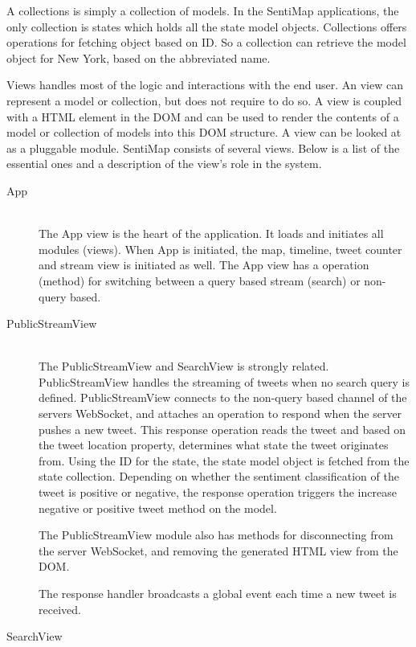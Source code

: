 A collections is simply a collection of models. In the SentiMap applications, the only collection is states which holds all the state model objects. Collections offers operations for fetching object based on ID. So a collection can retrieve the model object for New York, based on the abbreviated name. 

Views handles most of the logic and interactions with the end user. An view can represent a model or collection, but does not require to do so. A view is coupled with a HTML element in the DOM and can be used to render the contents of a model or collection of models into this DOM structure. A view can be looked at as a pluggable module. SentiMap consists of several views. Below is a list of the essential ones and a description of the view's role in the system.

\begin{description}
\item[App] \hfill \\
The App view is the heart of the application. It loads and initiates all modules (views). When App is initiated, the map, timeline, tweet counter and stream view is initiated as well. The App view has a operation (method) for switching between a query based stream (search) or non-query based.

\item[PublicStreamView] \hfill \\

The PublicStreamView and SearchView is strongly related. PublicStreamView handles the streaming of tweets when no search query is defined. PublicStreamView connects to the non-query based channel of the servers WebSocket, and attaches an operation to respond when the server pushes a new tweet. This response operation reads the tweet and based on the tweet location property, determines what state the tweet originates from. Using the ID for the state, the state model object is fetched from the state collection. Depending on whether the sentiment classification of the tweet is positive or negative, the response operation triggers the increase negative or positive tweet method on the model.

The PublicStreamView module also has methods for disconnecting from the server WebSocket, and removing the generated HTML view from the DOM.

The response handler broadcasts a global event each time a new tweet is received. 

\item[SearchView] \hfill \\


\end{description}
